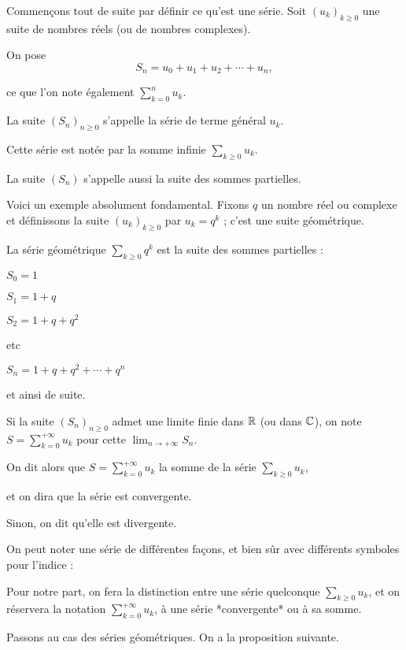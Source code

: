 Commençons tout de suite par définir ce qu'est une série. 
Soit $(u_k)_{k \ge 0}$ une suite de nombres réels (ou de nombres complexes).

\change
On pose
$$S_n=u_0+u_1+u_2+\cdots+ u_n,$$

\change
ce que l'on note également $\sum_{k=0}^n u_k.$

\change
La suite $(S_n)_{n \ge 0}$ s'appelle la série de terme général 
$u_k$.

\change
Cette série est notée par la somme infinie $\sum_{k \ge 0} u_k $.

\change
La suite $(S_n)$ s'appelle aussi la suite des sommes partielles.

\change
Voici un exemple absolument fondamental. 
Fixons $q$ un nombre réel ou complexe et définissons la suite $(u_k)_{k \ge 0}$ par
$u_k = q^k$ ; c'est une suite géométrique.

\change
La série géométrique $\sum_{k \ge 0} q^k$ est la suite des sommes partielles :

\change
$S_0 = 1$

\change
$S_1 = 1 + q$

\change
$S_2 = 1+q+q^2$

\change
etc

$S_n = 1+q+q^2+\cdots+q^n$ 

et ainsi de suite.

\diapo


Si la suite $(S_n)_{n \ge 0}$ admet une limite finie dans $\mathbb{R}$ (ou dans $\mathbb{C}$),
on note
$S = \sum_{k=0}^{+\infty} u_k$ pour cette $\lim_{n\to+\infty} S_n.$

\change
On dit alors que $\displaystyle S= \sum_{k=0}^{+\infty} u_k$ la somme de la série $\sum_{k \ge 0} u_k$,

\change
et on dira que la série est convergente.

\change
Sinon, on dit qu'elle est divergente. 

\change
On peut noter une série de différentes façons, et bien sûr avec différents symboles pour l'indice : 

\change
Pour notre part, on fera la distinction entre une série quelconque $\displaystyle \sum_{k \ge 0} u_k$,
et on réservera la notation $\displaystyle \sum_{k=0}^{+\infty} u_k$, 
à une série *convergente* ou à sa somme.

\diapo

Passons au cas des séries géométriques. On a la proposition suivante. 


